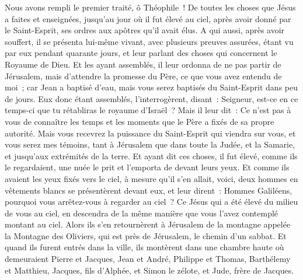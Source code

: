 \begin{multicols}{2}
\VerseOne{}Nous avons rempli le premier traité, ô Théophile~! De toutes les choses que Jésus a faites et enseignées, 
jusqu'au jour où il fut élevé au ciel, après avoir donné par le Saint-Esprit, ses ordres aux apôtres qu'il avait élus.
A qui aussi, après avoir souffert, il se présenta lui-même vivant, avec plusieurs preuves assurées, étant vu par eux pendant quarante jours, et leur parlant des choses qui concernent le Royaume de Dieu.
Et les ayant assemblés, il leur ordonna de ne pas partir de Jérusalem, mais d'attendre la promesse du Père, ce que vous avez entendu de moi~;
car Jean a baptisé d'eau, mais vous serez baptisés du Saint-Esprit dans peu de jours.
Eux donc étant assemblés, l'interrogèrent, disant~: Seigneur, est-ce en ce temps-ci que tu rétabliras le royaume d'Israël~?
Mais il leur dit~: Ce n'est pas à vous de connaître les temps et les moments que le Père a fixés de sa propre autorité.
Mais vous recevrez la puissance du Saint-Esprit qui viendra sur vous, et vous serez mes témoins, tant à Jérusalem que dans toute la Judée, et la Samarie, et jusqu'aux extrémités de la terre.
Et ayant dit ces choses, il fut élevé, comme ils le regardaient, une nuée le prit et l'emporta de devant leurs yeux.
Et comme ils avaient les yeux fixés vers le ciel, à mesure qu'il s'en allait, voici, deux hommes en vêtements blancs se présentèrent devant eux,
et leur dirent~: Hommes Galiléens, pourquoi vous arrêtez-vous à regarder au ciel~? Ce Jésus qui a été élevé du milieu de vous au ciel, en descendra de la même manière que vous l'avez contemplé montant au ciel.
Alors ils s'en retournèrent à Jérusalem de la montagne appelée la Montagne des Oliviers, qui est près de Jérusalem, le chemin d'un sabbat.
Et quand ils furent entrés dans la ville, ils montèrent dans une chambre haute où demeuraient Pierre et Jacques, Jean et André, Philippe et Thomas, Barthélemy et Matthieu, Jacques, fils d'Alphée, et Simon le zélote, et Jude, frère de Jacques.

\end{multicols}
